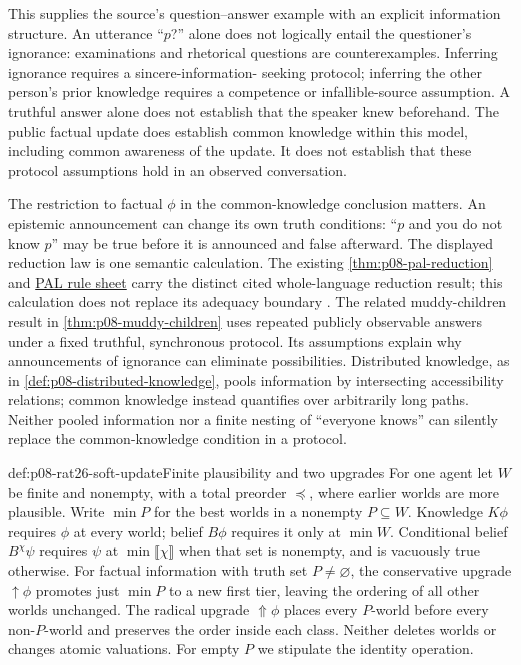 This supplies the source's question--answer example with an explicit
information structure. An utterance ``\(p\)?'' alone does not logically
entail the questioner's ignorance: examinations and rhetorical questions
are counterexamples. Inferring ignorance requires a sincere-information-
seeking protocol; inferring the other person's prior knowledge requires
a competence or infallible-source assumption. A truthful answer alone
does not establish that the speaker knew beforehand. The public factual
update does establish common knowledge within this model, including
common awareness of the update. It does not establish that these
protocol assumptions hold in an observed conversation.

The restriction to factual \(\phi\) in the common-knowledge conclusion
matters. An epistemic announcement can change its own truth conditions:
``\(p\) and you do not know \(p\)'' may be true before it is announced
and false afterward. The displayed reduction law is one semantic
calculation. The existing \cref{thm:p08-pal-reduction} and
\hyperref[sheet:hilbert-pal]{PAL rule sheet} carry the distinct cited
whole-language reduction result; this calculation does not replace its
adequacy boundary \cite[p.~189]{VanBenthemLiuSmets2021Logico}.
The related muddy-children result in \cref{thm:p08-muddy-children}
uses repeated publicly observable answers under a fixed truthful,
synchronous protocol. Its assumptions explain why announcements of
ignorance can eliminate possibilities. Distributed knowledge, as in
\cref{def:p08-distributed-knowledge}, pools information by intersecting
accessibility relations; common knowledge instead quantifies over
arbitrarily long paths. Neither pooled information nor a finite nesting
of ``everyone knows'' can silently replace the common-knowledge
condition in a protocol.

\begin{hbdefinition}{def:p08-rat26-soft-update}{Finite plausibility and two upgrades}
For one agent let \(W\) be finite and nonempty, with a total preorder
\(\preceq\), where earlier worlds are more plausible. Write
\(\min P\) for the best worlds in a nonempty \(P\subseteq W\).
Knowledge \(K\phi\) requires \(\phi\) at every world; belief
\(B\phi\) requires it only at \(\min W\). Conditional belief
\(B^\chi\psi\) requires \(\psi\) at \(\min\llbracket\chi\rrbracket\)
when that set is nonempty, and is vacuously true otherwise.
For factual information with truth set \(P\ne\varnothing\), the
conservative upgrade \(\uparrow\phi\) promotes just \(\min P\)
to a new first tier, leaving the ordering of all other worlds unchanged.
The radical upgrade \(\Uparrow\phi\) places every \(P\)-world
before every non-\(P\)-world and preserves the order inside each class.
Neither deletes worlds or changes atomic valuations. For empty \(P\)
we stipulate the identity operation.
\end{hbdefinition}

